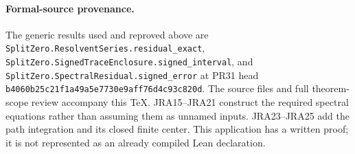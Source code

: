 \documentclass[11pt,a4paper]{article}
\begin{document}
\paragraph{Formal-source provenance.}
The generic results used and reproved above are
\texttt{SplitZero.ResolventSeries.residual\_exact},
\texttt{SplitZero.SignedTraceEnclosure.signed\_interval}, and
\texttt{SplitZero.SpectralResidual.signed\_error} at PR31 head
\texttt{b4060b25c21f1a49a5e7730e9aff76d4c93c820d}.
The source files and full theorem-scope review accompany this TeX.
JRA15--JRA21 construct the required spectral equations rather than
assuming them as unnamed inputs. JRA23--JRA25 add the path integration
and its closed finite center. This application has a written proof;
it is not represented as an already compiled Lean declaration.
\end{document}
